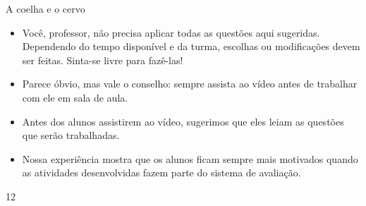 \begin{sugestions}{A coelha e o cervo}
{
\begin{itemize}
\item {} 
Você, professor, não precisa aplicar todas as questões aqui sugeridas. Dependendo do tempo disponível e da turma, escolhas ou modificações devem ser feitas. Sinta-se livre para fazê-las!

\item {} 
Parece óbvio, mas vale o conselho: sempre assista ao vídeo antes de trabalhar com ele em sala de aula.

\item {} 
Antes dos alunos assistirem ao vídeo, sugerimos que eles leiam as questões que serão trabalhadas.

\item {} 
Nossa experiência mostra que os alunos ficam sempre mais motivados quando as atividades desenvolvidas fazem parte do sistema de avaliação.

\end{itemize}
}{1}{2}
\end{sugestions}
